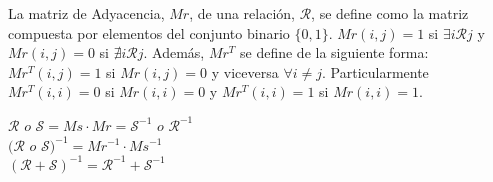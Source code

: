\documentclass[titlepage,a4paper,12pt,twoside]{article}
\begin{document}
La matriz de Adyacencia, $Mr$, de una relación, $ \mathcal{R} $, se define como la matriz compuesta por elementos del conjunto binario $\{0,1\}$. $Mr(i,j) = 1$ si $\exists i \mathcal{R} j$ y $Mr(i,j) = 0$ si $\nexists i \mathcal{R} j$. Además, $Mr^T$ se define de la siguiente forma: $Mr^T(i,j) = 1$ si $Mr(i,j) = 0$ y viceversa $\forall i \neq j$. Particularmente $Mr^T(i,i) = 0$ si $Mr(i,i) = 0$ y $Mr^T(i,i) = 1$ si $Mr(i,i) = 1$.

\begin{center}
$\mathcal{R} $ $ o $ $ \mathcal{S} = Ms \cdot Mr = \mathcal{S}^{-1} $ $o $ $\mathcal{R}^{-1}$\\
$(\mathcal{R} $ $ o $ $ \mathcal{S})^{-1} = Mr^{-1} \cdot Ms^{-1}$\\
$(\mathcal{R} + \mathcal{S})^{-1} = \mathcal{R}^{-1} + \mathcal{S}^{-1}$\\
\end{center}
\end{document}
